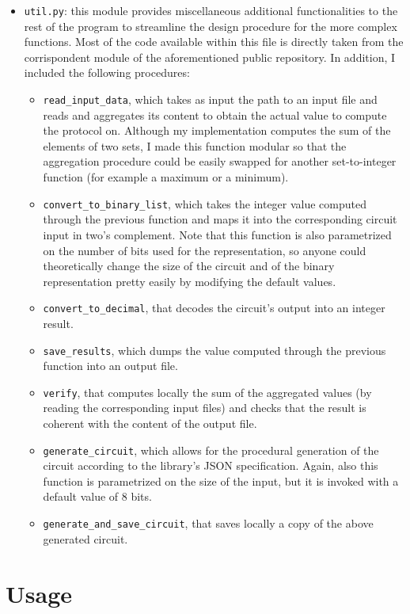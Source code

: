 \documentclass[12pt]{article}
\begin{document}
\begin{itemize}
  \item \texttt{util.py}: this module provides miscellaneous additional functionalities to the rest of the program to streamline the design procedure for the more complex functions. Most of the code available within this file is directly taken from the corrispondent module of the aforementioned public repository. In addition, I included the following procedures:
  \begin{itemize}
    \item \texttt{read\_input\_data}, which takes as input the path to an input file and reads and aggregates its content to obtain the actual value to compute the protocol on. Although my implementation computes the sum of the elements of two sets, I made this function modular so that the aggregation procedure could be easily swapped for another set-to-integer function (for example a maximum or a minimum).
    \item \texttt{convert\_to\_binary\_list}, which takes the integer value computed through the previous function and maps it into the corresponding circuit input in two's complement. Note that this function is also parametrized on the number of bits used for the representation, so anyone could theoretically change the size of the circuit and of the binary representation pretty easily by modifying the default values.
    \item \texttt{convert\_to\_decimal}, that decodes the circuit's output into an integer result.
    \item \texttt{save\_results}, which dumps the value computed through the previous function into an output file.
    \item \texttt{verify}, that computes locally the sum of the aggregated values (by reading the corresponding input files) and checks that the result is coherent with the content of the output file.
    \item \texttt{generate\_circuit}, which allows for the procedural generation of the circuit according to the library's JSON specification. Again, also this function is parametrized on the size of the input, but it is invoked with a default value of 8 bits.
    \item \texttt{generate\_and\_save\_circuit}, that saves locally a copy of the above generated circuit.
  \end{itemize} 
\end{itemize}

\section{Usage}\label{sec:running}
\end{document}

